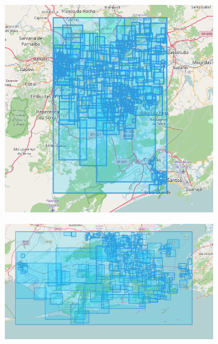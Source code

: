 \begin{figure}[htbp]
	\centering
	\begin{subfigure}[htbp]{0.4\textwidth}
		\centering
		\includegraphics[width=1\linewidth]{figures/sp_bbs.png}
		\caption{}
		\label{subfig:saopaulo_bounding_boxes}
	\end{subfigure}
	\quad
	\begin{subfigure}[htbp]{0.5\textwidth}
		\centering
		\includegraphics[width=1\linewidth]{figures/rio_bbs.png}
		\caption{}
		\label{subfig:riodejaneiro_bounding_boxes}
	\end{subfigure}
	
	\medskip
	

\end{figure}
